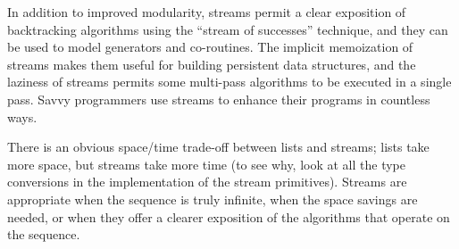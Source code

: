 In addition to improved modularity, streams permit a clear exposition of
backtracking algorithms using the ``stream of successes'' technique, and
they can be used to model generators and co-routines. The implicit
memoization of streams makes them useful for building persistent data
structures, and the laziness of streams permits some multi-pass
algorithms to be executed in a single pass. Savvy programmers use
streams to enhance their programs in countless ways.

There is an obvious space/time trade-off between lists and streams;
lists take more space, but streams take more time (to see why, look at
all the type conversions in the implementation of the stream
primitives). Streams are appropriate when the sequence is truly
infinite, when the space savings are needed, or when they offer a
clearer exposition of the algorithms that operate on the sequence.
